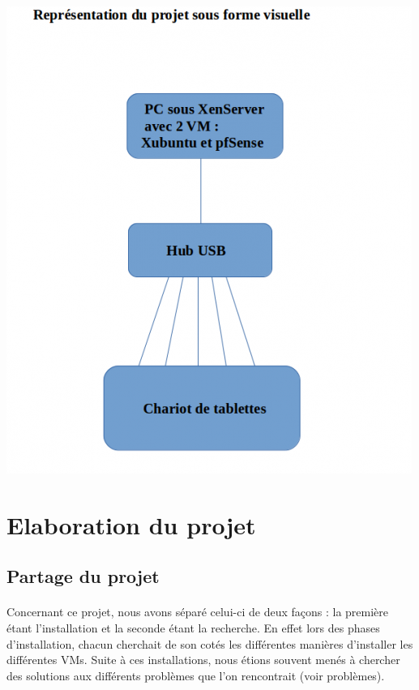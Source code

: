 \documentclass[a4paper,12pt]{extarticle}
\begin{document}
\begin{center}
\includegraphics[scale=0.90]{representation_projet}
\end{center}

\clearpage
\section{Elaboration du projet}
\subsection{Partage du projet}

\paragraph{}
Concernant ce projet, nous avons séparé celui-ci de deux façons : la première étant l’installation et la seconde étant la recherche. En effet lors des phases d’installation, 
chacun cherchait de son cotés les différentes manières d’installer les différentes VMs. Suite à ces installations, nous étions souvent menés à chercher des solutions aux différents problèmes que l’on rencontrait (voir problèmes).
\end{document}

